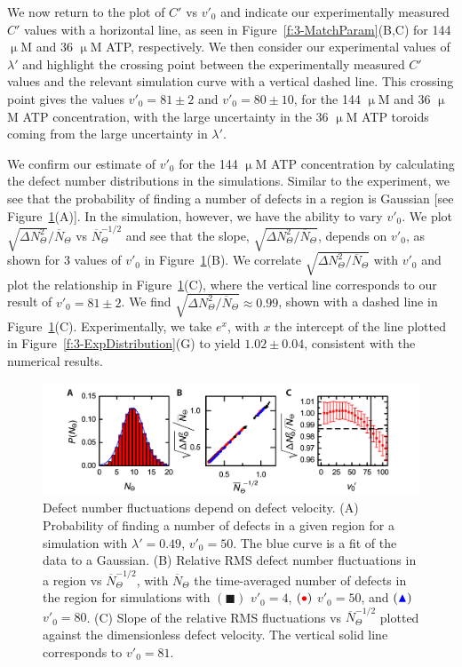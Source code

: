 We now return to the plot of $C'$ vs $v'_0$ and indicate our experimentally measured $C'$ values with a horizontal line, as seen in Figure~\ref{f:3-MatchParam}(B,C) for 144 $\upmu$M and 36 $\upmu$M ATP, respectively.
We then consider our experimental values of $\lambda'$  and highlight the crossing point between the experimentally measured $C'$ values and the relevant simulation curve with a vertical dashed line.
This crossing point gives the values $v'_0 = 81 \pm 2$ and $v'_0 = 80 \pm 10$, for the 144 $\upmu$M and 36 $\upmu$M ATP concentration, with the large uncertainty in the 36 $\upmu$M ATP toroids coming from the large uncertainty in $\lambda'$.

We confirm our estimate of $v'_0$ for the 144 $\upmu$M ATP concentration by calculating the defect number distributions in the simulations.
Similar to the experiment, we see that the probability of finding a number of defects in a region is Gaussian [see Figure~\ref{f:3-MatchDist}(A)].
In the simulation, however, we have the ability to vary $v'_0$.
We plot $\displaystyle{\sqrt{\Delta N_{\Theta}^2}} \bigg / \displaystyle {\overbar{N}_{\Theta}}$ vs $\overbar{N}_{\Theta}^{-1/2}$ and see that the slope, $\displaystyle \sqrt{\Delta N_{\Theta}^2 \big / \overbar{N}_{\Theta}}$, depends on $v'_0$, as shown for 3 values of $v'_0$ in Figure~\ref{f:3-MatchDist}(B).
We correlate $\displaystyle \sqrt{\Delta N_{\Theta}^2 \big / \overbar{N}_{\Theta}}$ with $v'_0$ and plot the relationship in Figure~\ref{f:3-MatchDist}(C), where the vertical line corresponds to our result of $v'_0 = 81 \pm 2$.
We find $\displaystyle \sqrt{\Delta N_{\Theta}^2 \big / \overbar{N}_{\Theta}} \approx 0.99$, shown with a dashed line in Figure~\ref{f:3-MatchDist}(C).
Experimentally, we take $e^x$, with $x$ the intercept of the line plotted in Figure~\ref{f:3-ExpDistribution}(G) to yield $1.02 \pm 0.04$, consistent with the numerical results.
\begin{figure}
  \centering
  \includegraphics{figures/C3/Ch3-Figs_MatchDist.png}
  \caption{Defect number fluctuations depend on defect velocity.
  (A) Probability of finding a number of defects in a given region for a simulation with $\lambda' = 0.49$, $v'_0 = 50$. The blue curve is a fit of the data to a Gaussian.
  (B) Relative RMS defect number fluctuations in a region vs $\overbar{N}_{\Theta}^{-1/2}$, with $\overbar{N}_{\Theta}$ the time-averaged number of defects in the region for simulations with
  $({\blacksquare})$ $v'_0 = 4$,
  $({\color{red} \bullet})$ $v'_0 = 50$, and
  $({\color{blue} \blacktriangle})$ $v'_0 = 80$.
  (C) Slope of the relative RMS fluctuations vs $\overbar{N}_{\Theta}^{-1/2}$ plotted against the dimensionless defect velocity. The vertical solid line corresponds to $v'_0 = 81$.}\label{f:3-MatchDist}
\end{figure}

